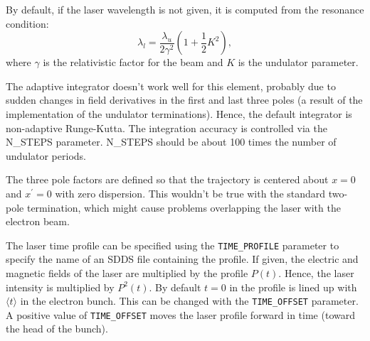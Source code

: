 By default, if the laser wavelength is not given, it is computed from the resonance
condition:
\begin{equation}
\lambda_l = \frac{\lambda_u}{2 \gamma^2} \left( 1 + \frac{1}{2} K^2 \right),
\end{equation}
where $\gamma$ is the relativistic factor for the beam and $K$ is the
undulator parameter.

The adaptive integrator doesn't work well for this element, probably
due to sudden changes in field derivatives in the first and last three
poles (a result of the implementation of the undulator terminations).
Hence, the default integrator is non-adaptive Runge-Kutta.  The
integration accuracy is controlled via the N\_STEPS parameter.
N\_STEPS should be about 100 times the number of undulator periods.

The three pole factors are defined so that the trajectory is centered
about $x=0$ and $x^\prime=0$ with zero dispersion.  This wouldn't be
true with the standard two-pole termination, which might cause problems 
overlapping the laser with the electron beam.

The laser time profile can be specified using the \verb|TIME_PROFILE|
parameter to specify the name of an SDDS file containing the
profile.   If given, the electric and magnetic fields of the laser are
multiplied by the profile $P(t)$.  Hence, the laser intensity is multiplied
by $P^2(t)$. By default $t=0$ in the
profile is lined up with $\langle t \rangle$ in the electron bunch.
This can be changed with the \verb|TIME_OFFSET| parameter. A positive
value of \verb|TIME_OFFSET| moves the laser profile forward in time (toward
the head of the bunch).
